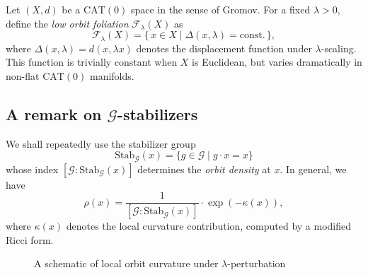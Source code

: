 \documentclass{amsart}
\begin{document}
Let %
$(X,d)$ be a $\mathrm{CAT}(0)$ space in the sense of Gromov.  
For a fixed $\lambda > 0$, define the \emph{low orbit foliation} $\mathcal{F}_\lambda(X)$ as
\begin{equation}\label{eq:foliation}
    \mathcal{F}_\lambda(X) = \{\,x \in X \mid \Delta(x, \lambda) = \text{const.}\,\},
\end{equation}
where $\Delta(x, \lambda) = d(x, \lambda x)$ denotes the displacement function under $\lambda$-scaling.  
This function is trivially constant when $X$ is Euclidean, but varies dramatically %
in non-flat $\mathrm{CAT}(0)$ %
manifolds.

\subsection{A remark on $\mathcal{G}$-stabilizers}
We shall repeatedly use the stabilizer %
group
\[
    \mathrm{Stab}_{\mathcal{G}}(x) = \{ g \in \mathcal{G} \mid g \cdot x = x \}
\]
whose %
index $[\mathcal{G} : \mathrm{Stab}_{\mathcal{G}}(x)]$ determines the \emph{orbit density} at $x$.  
In general, we have
\begin{equation}\label{eq:orbit-density}
    \rho(x) = \frac{1}{[\mathcal{G} : \mathrm{Stab}_{\mathcal{G}}(x)]} \cdot \exp(-\kappa(x)),
\end{equation}
where $\kappa(x)$ denotes the local curvature contribution, computed by a modified Ricci form.

\begin{figure}[htbp]
\centering
{}
\caption{A schematic of local orbit curvature under %
$\lambda$-perturbation%
}
\label{fig:curvature}
\end{figure}
\end{document}
